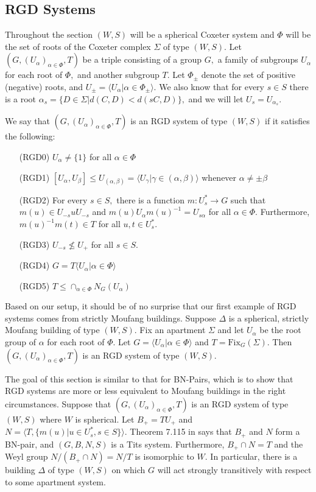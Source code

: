 \documentclass[class=book, crop=false,12 pt]{standalone}
\begin{document}
\subsection{RGD Systems}
Throughout the section $(W,S)$ will be a spherical Coxeter system and $\Phi$ will be the set of roots of the Coxeter complex $\Sigma$ of type $(W,S).$ Let $(G,(U_\alpha)_{\alpha\in \Phi},T)$ be a triple consisting of a group $G,$ a family of subgroups $U_\alpha$ for each root of $\Phi,$ and another subgroup $T.$ Let $\Phi_{\pm}$ denote the set of positive (negative) roots, and $U_{\pm}=\langle U_\alpha|\alpha\in \Phi_{\pm}\rangle.$ We also know that for every $s\in S$ there is a root $\alpha_s=\{D\in \Sigma|d(C,D)<d(sC,D)\},$ and we will let $U_s=U_{\alpha_s}.$ 

We say that $(G,(U_{\alpha})_{\alpha\in \Phi},T)$ is an RGD system of type $(W,S)$ if it satisfies the following:
\begin{itemize}
\setlength{\itemindent}{0.3 in}
	\item[(RGD0)] $U_\alpha\neq \{1\}$ for all $\alpha\in \Phi$
	\item[(RGD1)] $[U_\alpha,U_\beta]\le U_{(\alpha,\beta)}=\langle U_\gamma|\gamma\in (\alpha,\beta)\rangle$ whenever $\alpha\neq \pm \beta$
	\item[(RGD2)] For every $s\in S,$ there is a function $m:U_s^*\to G$ such that $m(u)\in U_{-s}uU_{-s}$ and $m(u)U_\alpha m(u)^{-1}=U_{s\alpha}$ for all $\alpha\in \Phi.$ Furthermore, $m(u)^{-1}m(t)\in T$ for all $u,t\in U_s^*.$
	\item[(RGD3)] $U_{-s}\not\le U_+$ for all $s\in S.$
	\item[(RGD4)] $G=T\langle U_\alpha|\alpha\in \Phi\rangle$
	\item[(RGD5)] $T\le \cap_{\alpha\in \Phi}N_G(U_\alpha)$
	\end{itemize}

Based on our setup, it should be of no surprise that our first example of RGD systems comes from strictly Moufang buildings. Suppose $\Delta$ is a spherical, strictly Moufang building of type $(W,S).$ Fix an apartment $\Sigma$ and let $U_\alpha$ be the root group of $\alpha$ for each root of $\Phi.$ Let $G=\langle U_\alpha|\alpha\in \Phi\rangle$ and $T=\mathrm{Fix}_G(\Sigma).$ Then $(G,(U_\alpha)_{\alpha\in \Phi},T)$ is an RGD system of type $(W,S).$ 

The goal of this section is similar to that for BN-Pairs, which is to show that RGD systems are more or less equivalent to Moufang buildings in the right circumstances. Suppose that $(G,(U_\alpha)_{\alpha\in \Phi},T)$ is an RGD system of type $(W,S)$ where $W$ is spherical. Let $B_+=TU_+$ and $N=\langle T,\{m(u)|u\in U_s^*, s\in S\}\rangle.$ Theorem 7.115 in \cite{buildings} says that $B_+$ and $N$ form a BN-pair, and $(G,B,N,S)$ is a Tits system. Furthermore, $B_+\cap N=T$ and the Weyl group $N/(B_+\cap N)=N/T$ is isomorphic to $W.$ In particular, there is a building $\Delta$ of type $(W,S)$ on which $G$ will act strongly transitively with respect to some apartment system.
\end{document}
